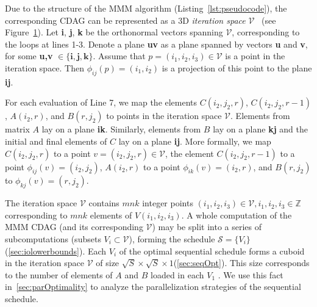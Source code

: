 \documentclass[sigplan,review,anonymous,10pt]{acmart}\settopmatter{printfolios=true,printccs=false,printacmref=false}
\begin{document}
\begin{figure}
	\label{fig:iterationSpace}
\end{figure}
%

 Due to the
structure of the MMM algorithm (Listing~\ref{lst:pseudocode}), the 
corresponding 
CDAG can be represented as a 3D \emph{iteration
space} $\mathcal{V}$~\cite{tiling} (see Figure~\ref{fig:iterationSpace}). Let 
\textbf{i}, \textbf{j}, \textbf{k} be the orthonormal vectors spanning 
$\mathcal{V}$,
corresponding to the loops at lines 1-3.  Denote a plane \textbf{uv} as a
plane spanned by vectors \textbf{u} and \textbf{v}, for some \textbf{u,v} $\in
\{\mathbf{i,j,k}\}$. Assume that $p = (i_1,i_2,i_3) \in \mathcal{V}$ is a point
in the iteration space. Then $\phi_{ij}(p) = (i_1,i_2)$ is a projection of this
point to the plane \textbf{ij}.

For each evaluation of Line 7, we map the elements \linebreak $C(i_2,j_2,r)$, 
$C(i_2,j_2,r-1)$, $A(i_2,r)$, and $B(r,j_2)$ to points in the iteration space 
$\mathcal{V}$. Elements from matrix $A$ lay on a plane \textbf{ik}. Similarly, 
elements from $B$ lay on a plane \textbf{kj} and the initial and final elements 
of $C$ lay on a plane \textbf{ij}. More formally, we map
$C(i_2,j_2,r)$ to a point
$v = (i_2,j_2,r) \in \mathcal{V}$, the element $C(i_2,j_2,r-1)$ to a point 
$\phi_{ij}(v) =
(i_2,j_2)$, $A(i_2,r)$ to a point $\phi_{ik}(v) = (i_2,r)$, and $B(r,j_2)$
to $\phi_{kj}(v) = (r,j_2)$.

The iteration space $\mathcal{V}$ contains $mnk$ integer points \linebreak
$(i_1,i_2,i_3) \in \mathcal{V}, i_1,i_2,i_3 \in \mathbb{Z}$ corresponding to 
$mnk$
elements of $V(i_1,i_2,i_3)$.  A whole computation of the MMM CDAG (and its
corresponding  $\mathcal{V}$) may be split into a series of subcomputations
(subsets $V_i \subset \mathcal{V}$), forming the schedule
$\mathcal{S} = \{V_i\}$ (\cref{sec:iolowerbounds}). Each $V_i$ of the optimal 
sequential schedule forms a cuboid in the iteration space $\mathcal{V}$ of 
size $\sqrt{S} \times \sqrt{S} \times 1$(\cref{sec:seqOpt}). This size 
corresponds to the number of 
elements of $A$ and $B$ loaded in each $V_1$ . We use this 
fact in~\cref{sec:parOptimality} to analyze the parallelization strategies of 
the sequential schedule.
\end{document}
